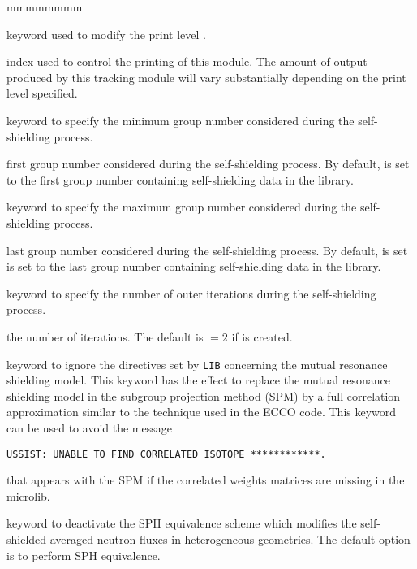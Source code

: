 \begin{ListeDeDescription}{mmmmmmmm}

\item[\moc{EDIT}] keyword used to modify the print level .

\item[\dusa{iprint}] index used to control the printing of this module. The
amount of output produced by this tracking module will vary substantially
depending on the print level specified. 

\item[\moc{GRMIN}] keyword to specify the minimum group number considered
during the self-shielding process.

\item[\dusa{lgrmin}] first group number considered during the
self-shielding process. By default,  is set to the first group
number containing self-shielding data in the library.

\item[\moc{GRMAX}]  keyword to specify the maximum group number considered
during the self-shielding process.

\item[\dusa{lgrmax}] last group number considered during the self-shielding
process. By default,  is set is set to the last group
number containing self-shielding data in the library.

\item[\moc{PASS}]  keyword to specify the number of outer iterations during
the self-shielding process.

\item[\dusa{ipass}] the number of iterations. The default is
 $=2$ if  is created.

\item[\moc{NOCO}]  keyword to ignore the directives set by {\tt LIB} concerning
the mutual resonance shielding model. This keyword has the effect to replace the
mutual resonance shielding model in the subgroup projection method (SPM) by a full
correlation approximation similar
to the technique used in the ECCO code. This keyword can be used to avoid the message
\begin{verbatim}
USSIST: UNABLE TO FIND CORRELATED ISOTOPE ************.
\end{verbatim}
\noindent that appears with the SPM if the correlated weights matrices are missing in
the microlib.

\item[\moc{NOSP}] keyword to deactivate the SPH equivalence scheme which
modifies the self-shielded averaged neutron fluxes in
heterogeneous geometries. The default option is to perform SPH equivalence.


\end{ListeDeDescription}
